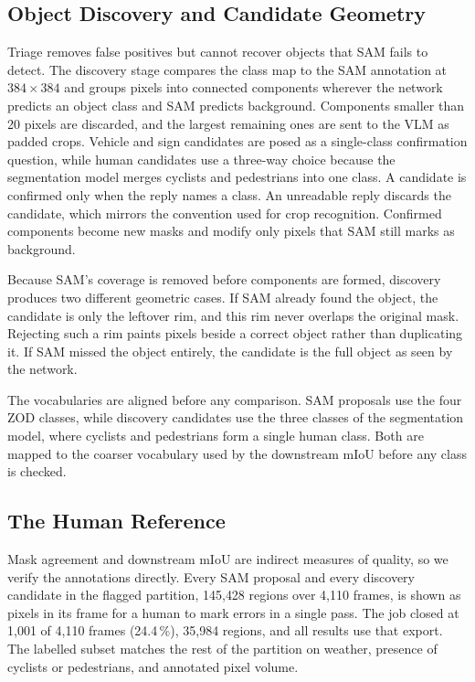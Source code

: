 \documentclass[journal]{IEEEtran}
\newcommand{\humancoverage}{1{,}001 of 4{,}110 frames (24.4\,\%), 35{,}984 regions}
\begin{document}
\subsection{Object Discovery and Candidate Geometry}
\label{sec:geometry}

Triage removes false positives but cannot recover objects that SAM fails to detect. 
The discovery stage compares the class map to the SAM annotation at $384 \times 384$ and groups pixels into connected components wherever the network predicts an object class and SAM predicts background. 
Components smaller than 20 pixels are discarded, and the largest remaining ones are sent to the VLM as padded crops. 
Vehicle and sign candidates are posed as a single-class confirmation question, while human candidates use a three-way choice because the segmentation model merges cyclists and pedestrians into one class. 
A candidate is confirmed only when the reply names a class. 
An unreadable reply discards the candidate, which mirrors the convention used for crop recognition. 
Confirmed components become new masks and modify only pixels that SAM still marks as background.

Because SAM's coverage is removed before components are formed, discovery produces two different geometric cases. 
If SAM already found the object, the candidate is only the leftover rim, and this rim never overlaps the original mask. 
Rejecting such a rim paints pixels beside a correct object rather than duplicating it. 
If SAM missed the object entirely, the candidate is the full object as seen by the network. 

The vocabularies are aligned before any comparison. 
SAM proposals use the four ZOD classes, while discovery candidates use the three classes of the segmentation model, where cyclists and pedestrians form a single human class. 
Both are mapped to the coarser vocabulary used by the downstream mIoU before any class is checked.


\subsection{The Human Reference}
\label{sec:human_verification}

Mask agreement and downstream mIoU are indirect measures of quality, so we verify the annotations directly. 
Every SAM proposal and every discovery candidate in the flagged partition, 145{,}428 regions over 4{,}110 frames, is shown as pixels in its frame for a human to mark errors in a single pass. 
The job closed at \humancoverage, and all results use that export.
The labelled subset matches the rest of the partition on weather, presence of cyclists or pedestrians, and annotated pixel volume. 
\end{document}
